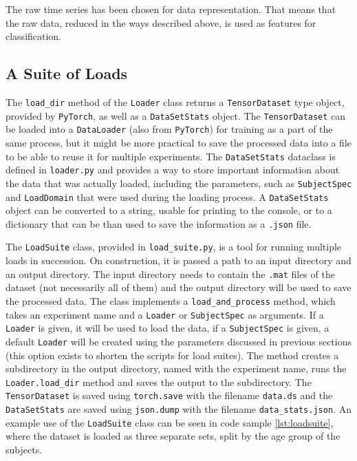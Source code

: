 \documentclass[english, he, bc, kiv, iso690alph, viewonly]{fasthesis}
\begin{document}
The raw time series has been chosen for data representation. That means that the raw data, reduced in the ways described above, is used as features for classification.

\subsection{A Suite of Loads}

The \texttt{load\_dir} method of the \texttt{Loader} class returns a \texttt{TensorDataset} type object, provided by \texttt{PyTorch}, as well as a \texttt{DataSetStats} object. The \texttt{TensorDataset} can be loaded into a \texttt{DataLoader} (also from \texttt{PyTorch}) for training as a part of the same process, but it might be more practical to save the processed data into a file to be able to reuse it for multiple experiments. The \texttt{DataSetStats} dataclass is defined in \texttt{loader.py} and provides a way to store important information about the data that was actually loaded, including the parameters, such as \texttt{SubjectSpec} and \texttt{LoadDomain} that were used during the loading process. A \texttt{DataSetStats} object can be converted to a string, usable for printing to the console, or to a dictionary that can be than used to save the information as a \texttt{.json} file.

The \texttt{LoadSuite} class, provided in \texttt{load\_suite.py}, is a tool for running multiple loads in succession. On construction, it is passed a path to an input directory and an output directory. The input directory needs to contain the \texttt{.mat} files of the dataset (not necessarily all of them) and the output directory will be used to save the processed data.
The class implements a \texttt{load\_and\_process} method, which takes an experiment name and a \texttt{Loader} or \texttt{SubjectSpec} as arguments. If a \texttt{Loader} is given, it will be used to load the data, if a \texttt{SubjectSpec} is given, a default \texttt{Loader} will be created using the parameters discussed in previous sections (this option exists to shorten the scripts for load suites).
The method creates a subdirectory in the output directory, named with the experiment name, runs the \texttt{Loader.load\_dir} method and saves the output to the subdirectory. The \texttt{TensorDataset} is saved using \texttt{torch.save} with the filename \texttt{data.ds} and the \texttt{DataSetStats} are saved using \texttt{json.dump} with the filename \texttt{data\_stats.json}. An example use of the \texttt{LoadSuite} class can be seen in code sample \ref{lst:loadsuite}, where the dataset is loaded as three separate sets, split by the age group of the subjects.
\end{document}
